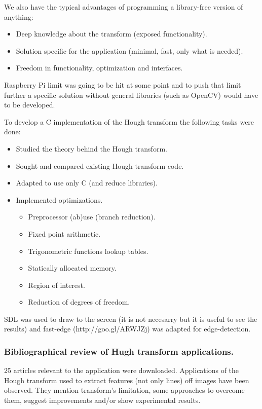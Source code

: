 We also have the typical advantages of programming a library-free version of anything:
\begin{itemize}
	\item Deep knowledge about the transform (exposed functionality).
	\item Solution specific for the application (minimal, fast, only what is needed).
	\item Freedom in functionality, optimization and interfaces.
\end{itemize}

Raspberry Pi limit was going to be hit at some point and to push that limit further a specific solution without general libraries (such as OpenCV) would have to be developed.

To develop a C implementation of the Hough transform the following tasks were done:

\begin{itemize}
	\item Studied the theory behind the Hough transform.
	\item Sought and compared existing Hough transform code.
	\item Adapted to use only C (and reduce libraries).
	\item Implemented optimizations.
	\begin{itemize}
		\item Preprocessor (ab)use (branch reduction).
		\item Fixed point arithmetic.
		\item Trigonometric functions lookup tables.
		\item Statically allocated memory.
		\item Region of interest.
		\item Reduction of degrees of freedom.
	\end{itemize}
\end{itemize}

SDL was used to draw to the screen (it is not necesarry but it is useful to see the results) and fast-edge (http://goo.gl/ARWJZj) was adapted for edge-detection.


\subsubsection{Bibliographical review of Hugh transform applications.}
25 articles relevant to the application were downloaded. Applications of the Hough transform used to extract features (not only lines) off images have been observed. They mention transform's limitation, some approaches to overcome them, suggest improvements and/or show experimental results.

